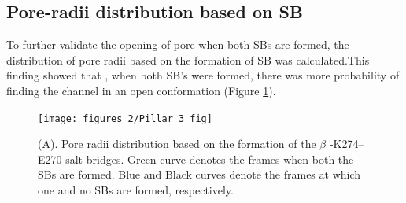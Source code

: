 \documentclass[9pt,twocolumn,twoside,lineno]{pnas-new}
\begin{document}
\subsection*{Pore-radii distribution based on SB}
To further validate the opening of pore when both SBs are formed, the distribution of pore radii based on the formation of SB was calculated.This finding showed that , when both SB's were formed, there was more probability of finding the channel in an open conformation (Figure \ref{fig:Pillar_3_fig}).
\begin{figure}
\centering
\texttt{[image: figures\_2/Pillar\_3\_fig]}
\caption{(A). Pore radii distribution based on the formation of the $\beta$ -K274--E270 salt-bridges. Green curve denotes the frames when both the SBs are formed. Blue and Black curves denote the frames at which one and no SBs are formed, respectively.}
\label{fig:Pillar_3_fig}
\end{figure}

 
\end{document}
